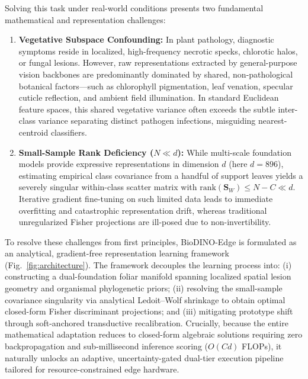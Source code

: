 \documentclass[conference]{IEEEtran}
\begin{document}
Solving this task under real-world conditions presents two fundamental mathematical and representation challenges:
\begin{enumerate}
    \item \textbf{Vegetative Subspace Confounding:} In plant pathology, diagnostic symptoms reside in localized, high-frequency necrotic specks, chlorotic halos, or fungal lesions. However, raw representations extracted by general-purpose vision backbones are predominantly dominated by shared, non-pathological botanical factors---such as chlorophyll pigmentation, leaf venation, specular cuticle reflection, and ambient field illumination. In standard Euclidean feature spaces, this shared vegetative variance often exceeds the subtle inter-class variance separating distinct pathogen infections, misguiding nearest-centroid classifiers.
    \item \textbf{Small-Sample Rank Deficiency ($N \ll d$):} While multi-scale foundation models provide expressive representations in dimension $d$ (here $d = 896$), estimating empirical class covariance from a handful of support leaves yields a severely singular within-class scatter matrix with $\text{rank}(\mathbf{S}_W) \le N - C \ll d$. Iterative gradient fine-tuning on such limited data leads to immediate overfitting and catastrophic representation drift, whereas traditional unregularized Fisher projections are ill-posed due to non-invertibility.
\end{enumerate}

To resolve these challenges from first principles, BioDINO-Edge is formulated as an analytical, gradient-free representation learning framework (Fig.~\ref{fig:architecture}). The framework decouples the learning process into: (i) constructing a dual-foundation foliar manifold spanning localized spatial lesion geometry and organismal phylogenetic priors; (ii) resolving the small-sample covariance singularity via analytical Ledoit--Wolf shrinkage to obtain optimal closed-form Fisher discriminant projections; and (iii) mitigating prototype shift through soft-anchored transductive recalibration. Crucially, because the entire mathematical adaptation reduces to closed-form algebraic solutions requiring zero backpropagation and sub-millisecond inference scoring ($O(Cd)$ FLOPs), it naturally unlocks an adaptive, uncertainty-gated dual-tier execution pipeline tailored for resource-constrained edge hardware.
\end{document}
